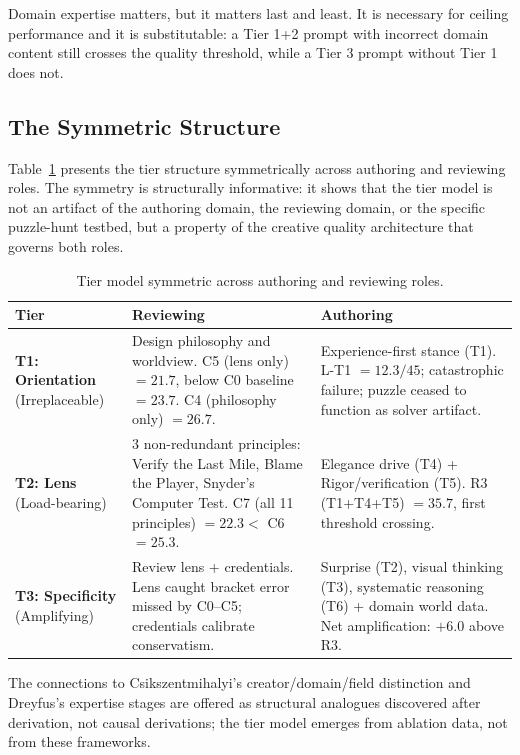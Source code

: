 Domain expertise matters, but it matters last and least. It is necessary for ceiling
performance and it is substitutable: a Tier 1+2 prompt with incorrect domain content
still crosses the quality threshold, while a Tier 3 prompt without Tier 1 does not.

\subsection{The Symmetric Structure}

Table~\ref{tab:tier-symmetric} presents the tier structure symmetrically across
authoring and reviewing roles. The symmetry is structurally informative: it shows that
the tier model is not an artifact of the authoring domain, the reviewing domain, or
the specific puzzle-hunt testbed, but a property of the creative quality architecture
that governs both roles.

\begin{table}[h]
\centering
\caption{Tier model symmetric across authoring and reviewing roles.}
\label{tab:tier-symmetric}
\begin{tabular}{p{2.2cm} p{5.2cm} p{5.2cm}}
\toprule
\textbf{Tier} & \textbf{Reviewing} & \textbf{Authoring} \\
\midrule
\textbf{T1: Orientation} (Irreplaceable)
& Design philosophy and worldview. C5 (lens only) $= 21.7$, below C0 baseline $= 23.7$. C4 (philosophy only) $= 26.7$.
& Experience-first stance (T1). L-T1 $= 12.3/45$; catastrophic failure; puzzle ceased to function as solver artifact. \\
\addlinespace
\textbf{T2: Lens} (Load-bearing)
& 3 non-redundant principles: Verify the Last Mile, Blame the Player, Snyder's Computer Test. C7 (all 11 principles) $= 22.3 <$ C6 $= 25.3$.
& Elegance drive (T4) + Rigor/verification (T5). R3 (T1+T4+T5) $= 35.7$, first threshold crossing. \\
\addlinespace
\textbf{T3: Specificity} (Amplifying)
& Review lens + credentials. Lens caught bracket error missed by C0--C5; credentials calibrate conservatism.
& Surprise (T2), visual thinking (T3), systematic reasoning (T6) + domain world data. Net amplification: $+6.0$ above R3. \\
\bottomrule
\end{tabular}
\end{table}

The connections to Csikszentmihalyi's creator/domain/field distinction and Dreyfus's
expertise stages are offered as structural analogues discovered after derivation, not
causal derivations; the tier model emerges from ablation data, not from these frameworks.

